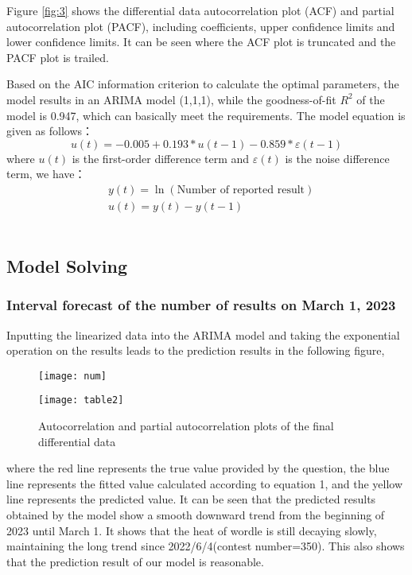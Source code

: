 \documentclass[12pt]{mcmthesis}
\begin{document}
Figure \ref{fig:3} shows the differential data autocorrelation plot (ACF) and partial autocorrelation plot (PACF), including coefficients, upper confidence limits and lower confidence limits. It can be seen where the ACF plot is truncated and the PACF plot is trailed.

Based on the AIC information criterion to calculate the optimal parameters, the model results in an ARIMA model (1,1,1), while the goodness-of-fit $ R^{2} $ of the model is 0.947, which can basically meet the requirements. The model equation is given as follows：
\begin{equation}\label{eq:1}
u\left( t \right) =-0.005+0.193*u\left( t-1 \right) -0.859*\varepsilon \left( t-1 \right) 
\end{equation}
where $ u(t) $ is the first-order difference term and $ \varepsilon (t) $ is the noise difference term, we have：
\begin{equation*}\label{}
\begin{aligned}
	&y\left( t \right) =\ln \left( \text{Number\ of\ reported\ result} \right)\\
	&u\left( t \right) =y\left( t \right) -y\left( t-1 \right) 
\end{aligned}
\end{equation*}
\\[0.01pt]
\subsection{Model Solving}
\subsubsection{Interval forecast of the number of results on March 1, 2023}
\hspace{1.4em}Inputting the linearized data into the ARIMA model and taking the exponential operation on the results leads to the prediction results in the following figure,
\begin{figure}[h]
	\centering
	\begin{minipage}[c]{0.56\textwidth}
		\centering
		\texttt{[image: num]}
		\label{fig4_1}
	\end{minipage}
\quad
	\begin{minipage}[c]{0.4\textwidth}
		\centering
		\texttt{[image: table2]}
		\label{fig4_2}
	\end{minipage}
	\caption{Autocorrelation and partial autocorrelation plots of the final differential data}
	\label{fig:4}
\end{figure}
where the red line represents the true value provided by the question, the blue line represents the fitted value calculated according to equation 1, and the yellow line represents the predicted value. It can be seen that the predicted results obtained by the model show a smooth downward trend from the beginning of 2023 until March 1. It shows that the heat of wordle is still decaying slowly, maintaining the long trend since 2022/6/4(contest number=350). This also shows that the prediction result of our model is reasonable.
\end{document}
